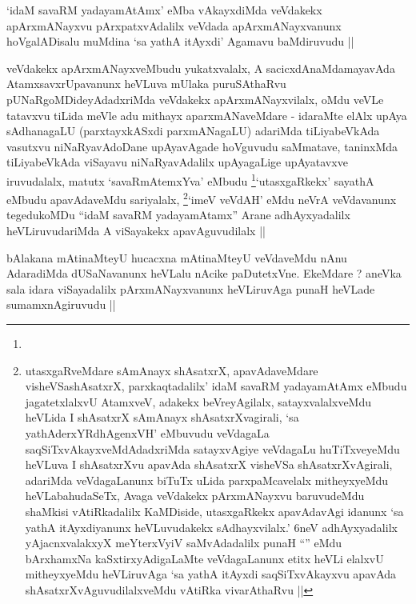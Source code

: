 
\begin{artha}
`idaM savaRM yadayamAtAmx' eMba vAkayxdiMda veVdakekx apArxmANayxvu pArxpatxvAdalilx veVdada apArxmANayxvanunx hoVgalADisalu muMdina `sa yathA itAyxdi' Agamavu baMdiruvudu ||
\end{artha}

\begin{artha}
veVdakekx apArxmANayxveMbudu yukatxvalalx, A sacicxdAnaMdamayavAda AtamxsavxrUpavanunx heVLuva mUlaka puruSAthaRvu pUNaRgoMDideyAdadxriMda veVdakekx apArxmANayxvilalx, oMdu veVLe tatavxvu tiLida meVle adu mithayx aparxmANaveMdare - idaraMte elAlx upAya sAdhanagaLU (parxtayxkASxdi parxmANagaLU) adariMda tiLiyabeVkAda vasutxvu niNaRyavAdoDane upAyavAgade hoVguvudu saMmatave, taninxMda tiLiyabeVkAda viSayavu niNaRyavAdalilx upAyagaLige upAyatavxve iruvudalalx, matutx `savaRmAtemxYva' eMbudu \footnote[1]{}`utasxgaRkekx' sayathA eMbudu apavAdaveMdu sariyalalx, \footnote[1]{utasxgaRveMdare sAmAnayx shAsatxrX, apavAdaveMdare visheVSashAsatxrX, parxkaqtadalilx' idaM savaRM yadayamAtAmx eMbudu jagatetxlalxvU AtamxveV, adakekx beVreyAgilalx, satayxvalalxveMdu heVLida I shAsatxrX sAmAnayx shAsatxrXvagirali, `sa yathA\s derxYRdhAgenxVH' eMbuvudu veVdagaLa saqSiTxvAkayxveMdAdadxriMda satayxvAgiye veVdagaLu huTiTxveyeMdu heVLuva I shAsatxrXvu apavAda shAsatxrX visheVSa shAsatxrXvAgirali, adariMda veVdagaLanunx biTuTx uLida parxpaMcavelalx mitheyxyeMdu heVLabahudaSeTx, Avaga veVdakekx pArxmANayxvu baruvudeMdu shaMkisi vAtiRkadalilx KaMDiside, utasxgaRkekx apavAdavAgi idanunx `sa yathA itAyxdiyanunx heVLuvudakekx sAdhayxvilalx.' 6neV adhAyxyadalilx yAjacnxvalakxyX meYterxVyiV saMvAdadalilx punaH ``'' eMdu bArxhamxNa kaSxtirxyAdigaLaMte veVdagaLanunx etitx heVLi elalxvU mitheyxyeMdu heVLiruvAga `sa yathA itAyxdi saqSiTxvAkayxvu apavAda shAsatxrXvAguvudilalxveMdu vAtiRka vivarAthaRvu ||}`imeV veVdAH' eMdu neVrA veVdavanunx tegedukoMDu ``idaM savaRM yadayamAtamx'' \footnotemark[2]Arane adhAyxyadalilx heVLiruvudariMda A viSayakekx apavAguvudilalx ||
\end{artha}


\begin{artha}
bAlakana mAtinaMteyU hucacxna mAtinaMteyU veVdaveMdu nAnu AdaradiMda dUSaNavanunx heVLalu nAcike paDutetxVne. EkeMdare ? aneVka sala idara viSayadalilx pArxmANayxvanunx heVLiruvAga punaH heVLade sumamxnAgiruvudu ||
\end{artha}

